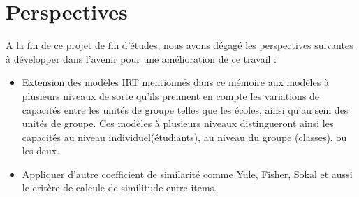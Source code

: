 \section*{\textbf{Perspectives}}
A la fin de ce projet de fin d’études, nous avons dégagé les perspectives suivantes à développer dans l’avenir pour une amélioration de ce travail :

\begin{itemize}
    \item Extension des modèles IRT mentionnés dans ce mémoire aux modèles à plusieurs niveaux de sorte qu'ils prennent en compte les variations de capacités entre les unités de groupe telles que les écoles, ainsi qu'au sein des unités de groupe. Ces modèles à plusieurs niveaux distingueront ainsi les capacités au niveau individuel(étudiants), au niveau du groupe (classes), ou les deux.
    \item Appliquer d’autre coefficient de similarité comme Yule, Fisher, Sokal et aussi le critère de calcule de similitude entre items.
\end{itemize}



